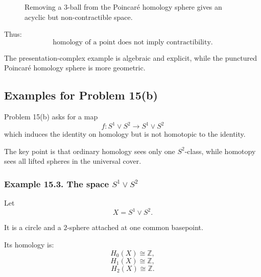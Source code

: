 \documentclass[12pt,a4paper]{article}
\theoremstyle{notespace}
\begin{document}
\begin{figure}[htbp]
	\centering
	\caption{Removing a \(3\)-ball from the Poincaré homology sphere gives an acyclic but non-contractible space.}
\end{figure}

Thus:
\[
\boxed{
	\text{homology of a point does not imply contractibility.}
}
\]

The presentation-complex example is algebraic and explicit, while the punctured Poincaré homology sphere is more geometric.

\subsection{Examples for Problem 15(b)}

Problem 15(b) asks for a map
\[
f:S^1\vee S^2\to S^1\vee S^2
\]
which induces the identity on homology but is not homotopic to the identity.

The key point is that ordinary homology sees only one \(S^2\)-class, while homotopy sees all lifted spheres in the universal cover.

\subsubsection*{Example 15.3. The space \(S^1\vee S^2\)}

Let
\[
X=S^1\vee S^2.
\]

It is a circle and a \(2\)-sphere attached at one common basepoint.

Its homology is:
\[
H_0(X)\cong \mathbb Z,
\]
\[
H_1(X)\cong \mathbb Z,
\]
\[
H_2(X)\cong \mathbb Z.
\]
\end{document}
